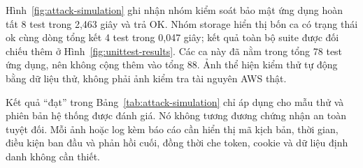 Hình~\ref{fig:attack-simulation} ghi nhận nhóm kiểm soát bảo mật ứng dụng hoàn tất 8 test trong 2,463 giây và trả OK. Nhóm storage hiển thị bốn ca có trạng thái ok cùng dòng tổng kết 4 test trong 0,047 giây; kết quả toàn bộ suite được đối chiếu thêm ở Hình~\ref{fig:unittest-results}. Các ca này đã nằm trong tổng 78 test ứng dụng, nên không cộng thêm vào tổng 88. Ảnh thể hiện kiểm thử tự động bằng dữ liệu thử, không phải ảnh kiểm tra tài nguyên AWS thật.

Kết quả ``đạt'' trong Bảng~\ref{tab:attack-simulation} chỉ áp dụng cho mẫu thử và phiên bản hệ thống được đánh giá. Nó không tương đương chứng nhận an toàn tuyệt đối. Mỗi ảnh hoặc log kèm báo cáo cần hiển thị mã kịch bản, thời gian, điều kiện ban đầu và phản hồi cuối, đồng thời che token, cookie và dữ liệu định danh không cần thiết.

